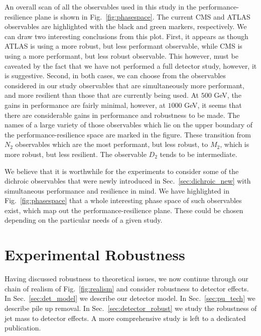 \documentclass[11pt,letterpaper]{article}
\DeclareRobustCommand{\Sec}[1]{Sec.~\ref{#1}}
\DeclareRobustCommand{\Fig}[1]{Fig.~\ref{#1}}
\begin{document}
An overall scan of all the observables used in this study in the performance-resilience plane is shown in \Fig{fig:phasespace}. The current CMS and ATLAS observables are highlighted with the black and green markers, respectively. We can draw two interesting conclusions from this plot. First, it appears as though ATLAS is using a more robust, but less performant observable, while CMS is using a more performant, but less robust observable. This however, must be caveated by the fact that we have not performed a full detector study, however, it is suggestive. Second, in both cases, we can choose from the observables considered in our study observables that are simultaneously more performant, and more resilient than those that are currently being used. At $500$ GeV, the gains in performance are fairly minimal, however, at $1000$ GeV, it seems that there are considerable gains in performance and robustness to be made.
The names of a large variety of those observables which lie on the upper boundary of the performance-resilience space are marked in the figure. These transition from $N_2$ observables which are the most performant, but less robust, to $M_2$, which is more robust, but less resilient. The observable $D_2$ tends to be intermediate.

We believe that it is worthwhile for the experiments to consider some of the  dichroic observables that were newly introduced in \Sec{sec:dichroic_new} with simultaneous performance and resilience in mind. We have highlighted in \Fig{fig:phasespace} that a whole interesting phase space of such observables exist, which map out the performance-resilience plane. These could be chosen depending on the particular needs of a given study.


\section{Experimental Robustness}\label{sec:exp}

Having discussed robustness to theoretical issues, we now continue through our chain of realism of \Fig{fig:realism} and consider robustness to detector effects.
In \Sec{sec:det_model} we describe our detector model. In \Sec{sec:pu_tech} we describe pile up removal. In \Sec{sec:detector_robust} we study the robustness of jet mass to detector effects. A more comprehensive study is left to a dedicated publication.

\end{document}
